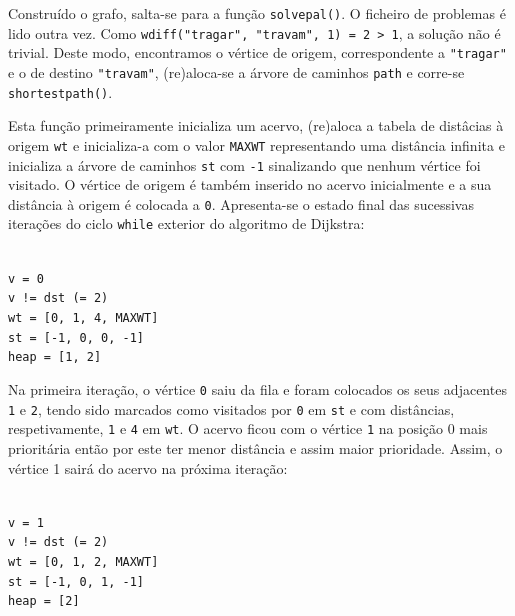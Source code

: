 \documentclass[a4paper, 18pt]{article}
\newcommand\tu[0]{\textunderscore}
\begin{document}
	\par
	Construído o grafo, salta-se para a função \texttt{solve\tu pal()}. O ficheiro de problemas é lido outra vez. Como \texttt{w\tu diff("tragar", "travam", 1) = 2 > 1}, a solução não é trivial. Deste modo, encontramos o vértice de origem, correspondente a \texttt{"tragar"} e o de destino \texttt{"travam"}, (re)aloca-se a árvore de caminhos \texttt{path} e corre-se \texttt{shortest\tu path()}.
	\par
	Esta função primeiramente inicializa um acervo, (re)aloca a tabela de distâcias à origem \texttt{wt} e inicializa-a com o valor \texttt{MAX\tu WT} representando uma distância infinita e inicializa a árvore de caminhos \texttt{st} com \texttt{-1} sinalizando que nenhum vértice foi visitado. O vértice de origem é também inserido no acervo inicialmente e a sua distância à origem é colocada a \texttt{0}. Apresenta-se o estado final das sucessivas iterações do ciclo \texttt{while} exterior do algoritmo de Dijkstra:
	\begin{center}
		\begin{minipage}{0.45\linewidth}
		\texttt{\\
		v = 0\\
		v != dst (= 2) \\
		wt = [0, 1, 4, MAX\tu WT] \\
		st = [-1, 0, 0, -1] \\
		heap = [1, 2] \\}
		\end{minipage}
	\end{center}
	\par
	Na primeira iteração, o vértice \texttt{0} saiu da fila e foram colocados os seus adjacentes \texttt{1} e \texttt{2}, tendo sido marcados como visitados por \texttt{0} em \texttt{st} e com distâncias, respetivamente, \texttt{1} e \texttt{4} em \texttt{wt}. O acervo ficou com o vértice \texttt{1} na posição 0 mais prioritária então por este ter menor distância e assim maior prioridade. Assim, o vértice 1 sairá do acervo na próxima iteração:
	\begin{center}
		\begin{minipage}{0.45\linewidth}
			\texttt{\\
			v = 1\\
			v != dst (= 2) \\
			wt = [0, 1, 2, MAX\tu WT] \\
			st = [-1, 0, 1, -1] \\
			heap = [2] \\}
		\end{minipage}
		\hspace{0.05\linewidth}
	\end{center}
\end{document}
